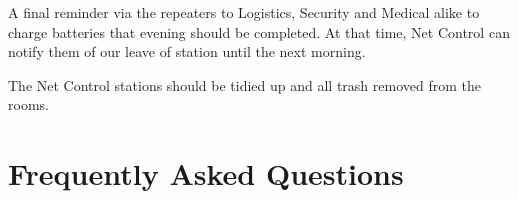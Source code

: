 \documentclass[pdflatex,letterpaper,twoside,12pt]{book}
\begin{document}
A final reminder via the repeaters to Logistics, Security and Medical alike to charge batteries that evening should be completed. At that time, Net Control can notify them of our leave of station until the next morning.

The Net Control stations should be tidied up and all trash removed from the rooms.


\chapter{Frequently Asked Questions}

\iffalse %
 * Need to develop a FAQ - Net control runs event,
   Don't know? Ask Net control, etc... Get food, and stay hydrated! 3rd
   party traffic is allowed - know when to hand the radio to that person!
\fi %
\end{document}
